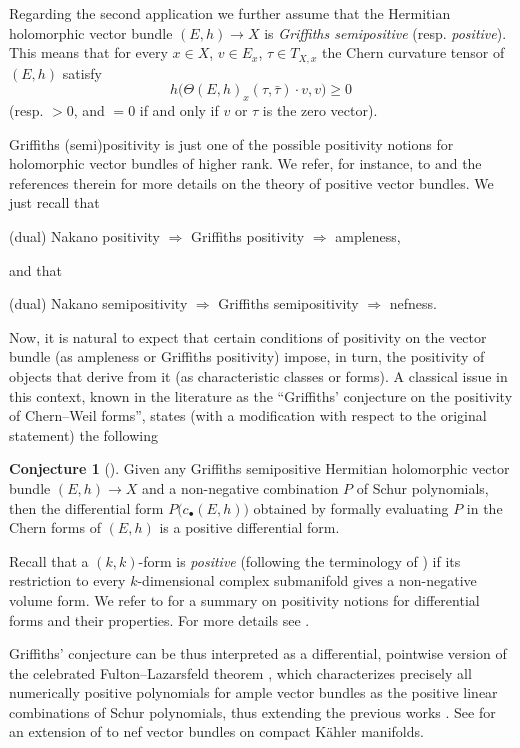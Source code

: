 \documentclass[a4paper]{amsart}
\theoremstyle{plain}%
\theoremstyle{definition}
\newtheorem*{conjecture}{Conjecture}
\theoremstyle{remark}
\begin{document}
	Regarding the second application we further assume that the Hermitian holomorphic vector bundle $ (E,h) \to X $ is \emph{Griffiths semipositive} (resp. \emph{positive}).
	This means that for every $ x \in X $, $ v \in E_x $, $ \tau \in T_{X,x} $ the Chern curvature tensor of $ (E,h) $ satisfy
	\[
	h\big(\Theta(E,h)_x(\tau,\bar\tau) \cdot v,v \big) \ge 0
	\]
	(resp. $ > 0 $, and $ = 0 $ if and only if $ v $ or $ \tau $ is the zero vector).
	
	Griffiths (semi)positivity is just one of the possible positivity notions for holomorphic vector bundles of higher rank.
	We refer, for instance, to \cite{Gri69,DPS94,Laz04,Dem01,LSY13,Fin20} and the references therein for more details on the theory of positive vector bundles.
	We just recall that
	\begin{center}
		(dual) Nakano positivity $ \Rightarrow $ Griffiths positivity $ \Rightarrow $ ampleness,
	\end{center}
	and that
	\begin{center}
		(dual) Nakano semipositivity $ \Rightarrow $ Griffiths semipositivity $ \Rightarrow $ nefness.
	\end{center}
	
	Now, it is natural to expect that certain conditions of positivity on the vector bundle (as ampleness or Griffiths positivity) impose, in turn, the positivity of objects that derive from it (as characteristic classes or forms).
	A classical issue in this context, known in the literature as the {\textquotedblleft}Griffiths' conjecture on the positivity of Chern--Weil forms{\textquotedblright}, states (with a modification with respect to the original statement) the following
	\begin{conjecture}[\cite{Gri69}]
		Given any Griffiths semipositive Hermitian holomorphic vector bundle $ (E,h) \to X $ and a non-negative combination $ P $ of Schur polynomials, then the differential form $ P\big( c_{\bullet}(E,h) \big) $ obtained by formally evaluating $ P $ in the Chern forms of $ (E,h) $ is a positive differential form.
	\end{conjecture}
	Recall that a $ (k,k) $-form is \emph{positive} (following the terminology of \cite{Dem01}) if its restriction to every $ k $-dimensional complex submanifold gives a non-negative volume form.
	We refer to \cite[Section~{1.1}]{Fag20} for a summary on positivity notions for differential forms and their properties.
	For more details see \cite{HK74,Dem01}.
	
	Griffiths' conjecture can be thus interpreted as a differential, pointwise version of the celebrated Fulton--Lazarsfeld theorem \cite{FL83}, which characterizes precisely all numerically positive polynomials for ample vector bundles as the positive linear combinations of Schur polynomials, thus extending the previous works \cite{Kle69,BG71,Gie71,UT77}.
	See \cite[Theorem~2.5]{DPS94} for an extension of \cite[Theorem~3.1]{FL83} to nef vector bundles on compact K\"ahler manifolds.
	
\end{document}
